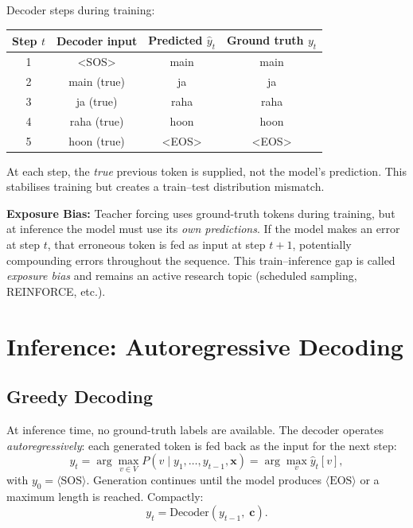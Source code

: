 \documentclass[12pt,a4paper]{article}
\begin{document}
\begin{example}[title={Teacher Forcing for ``I am going'' $\to$ ``main ja raha hoon''}]
  Decoder steps during training:
  \begin{center}
    \begin{tabular}{@{}cccc@{}}
      \toprule
      Step $t$ & Decoder input & Predicted $\hat{y}_t$ & Ground truth $y_t$ \\
      \midrule
      1 & \textless{}SOS\textgreater & main & main \\
      2 & main (true) & ja & ja \\
      3 & ja (true) & raha & raha \\
      4 & raha (true) & hoon & hoon \\
      5 & hoon (true) & \textless{}EOS\textgreater & \textless{}EOS\textgreater \\
      \bottomrule
    \end{tabular}
  \end{center}
  At each step, the \emph{true} previous token is supplied, not the model's prediction.
  This stabilises training but creates a train--test distribution mismatch.
\end{example}

\begin{warningbox}
  \textbf{Exposure Bias:} Teacher forcing uses ground-truth tokens during training, but at
  inference the model must use its \emph{own predictions}. If the model makes an error at
  step $t$, that erroneous token is fed as input at step $t+1$, potentially compounding
  errors throughout the sequence. This train--inference gap is called \emph{exposure bias}
  and remains an active research topic (scheduled sampling, REINFORCE, etc.).
\end{warningbox}

\section{Inference: Autoregressive Decoding}
\label{sec:inference}

\subsection{Greedy Decoding}

At inference time, no ground-truth labels are available. The decoder operates
\emph{autoregressively}: each generated token is fed back as the input for the next step:
\begin{equation}
  y_t = \arg\max_{v \in V} P\!\left(v \mid y_1, \ldots, y_{t-1}, \mathbf{x}\right)
      = \arg\max_v \hat{y}_t[v],
  \label{eq:greedy}
\end{equation}
with $y_0 = \langle\text{SOS}\rangle$. Generation continues until the model produces
$\langle\text{EOS}\rangle$ or a maximum length is reached. Compactly:
\begin{equation}
  y_t = \text{Decoder}\!\left(y_{t-1},\; \mathbf{c}\right).
  \label{eq:autoregressive}
\end{equation}
\end{document}
